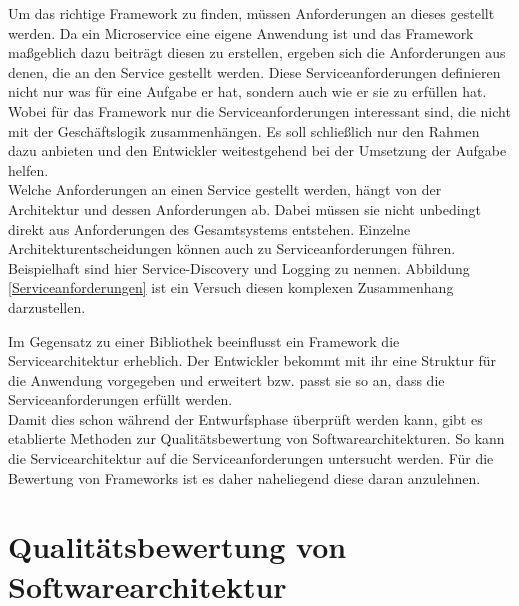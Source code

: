 Um das richtige Framework zu finden, müssen Anforderungen an dieses gestellt werden. Da ein Microservice eine eigene Anwendung ist und das Framework maßgeblich dazu beiträgt diesen zu erstellen, ergeben sich die Anforderungen aus denen, die an den Service gestellt werden. Diese Serviceanforderungen definieren nicht nur was für eine Aufgabe er hat, sondern auch wie er sie zu erfüllen hat.\\ 
Wobei für das Framework nur die Serviceanforderungen interessant sind, die nicht mit der Geschäftslogik zusammenhängen. Es soll schließlich nur den Rahmen dazu anbieten und den Entwickler weitestgehend bei der Umsetzung der Aufgabe helfen.\\
Welche Anforderungen an einen Service gestellt werden, hängt von der Architektur und dessen Anforderungen ab.
Dabei müssen sie nicht unbedingt direkt aus Anforderungen des Gesamtsystems entstehen. Einzelne Architekturentscheidungen können auch zu Serviceanforderungen führen. Beispielhaft sind hier Service-Discovery und Logging zu nennen. 
Abbildung \ref{Serviceanforderungen} ist ein Versuch diesen komplexen Zusammenhang darzustellen.\\



Im Gegensatz zu einer Bibliothek beeinflusst ein Framework die Servicearchitektur erheblich. Der Entwickler bekommt mit ihr eine Struktur für die Anwendung vorgegeben und erweitert bzw. passt sie so an, dass die Serviceanforderungen erfüllt werden.\\
Damit dies schon während der Entwurfsphase überprüft werden kann, gibt es etablierte Methoden zur Qualitätsbewertung von Softwarearchitekturen. So kann die Servicearchitektur auf die Serviceanforderungen untersucht werden. Für die Bewertung von Frameworks ist es daher naheliegend diese daran anzulehnen.  
 
\pagebreak
\section{Qualitätsbewertung von Softwarearchitektur}\label{Qualitätsbewertung_Softwarearchitektur}


